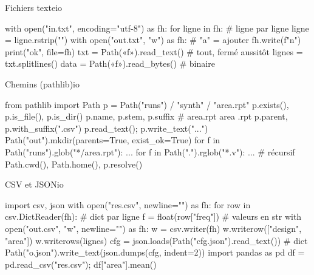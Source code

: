 \documentclass{article}
\begin{document}
\newpage
{}
\noindent
\begin{colonne}
\begin{bloc}{Fichiers texte}{io}
\begin{code}
with open("in.txt", encoding="utf-8") as fh:
    for ligne in fh:           # ligne par ligne
        ligne = ligne.rstrip("\n")
with open("out.txt", "w") as fh:  # "a" = ajouter
    fh.write(f"{n}\n")
    print("ok", file=fh)
txt = Path(«f»).read_text()      # tout, fermé aussitôt
lignes = txt.splitlines()
data = Path(«f»).read_bytes()    # binaire
\end{code}
\end{bloc}

\begin{bloc}{Chemins (pathlib)}{io}
\begin{code}
from pathlib import Path
p = Path("runs") / "synth" / "area.rpt"
p.exists(), p.is_file(), p.is_dir()
p.name, p.stem, p.suffix  # area.rpt area .rpt
p.parent, p.with_suffix(".csv")
p.read_text(); p.write_text("...")
Path("out").mkdir(parents=True, exist_ok=True)
for f in Path("runs").glob("*/area.rpt"): ...
for f in Path(".").rglob("*.v"): ...  # récursif
Path.cwd(), Path.home(), p.resolve()
\end{code}
\end{bloc}

\begin{bloc}{CSV et JSON}{io}
\begin{code}
import csv, json
with open("res.csv", newline="") as fh:
    for row in csv.DictReader(fh):  # dict par ligne
        f = float(row["freq"])      # valeurs en str
with open("out.csv", "w", newline="") as fh:
    w = csv.writer(fh)
    w.writerow(["design", "area"])
    w.writerows(lignes)
cfg = json.loads(Path("cfg.json").read_text())  # dict
Path("o.json").write_text(json.dumps(cfg, indent=2))
import pandas as pd
df = pd.read_csv("res.csv"); df["area"].mean()
\end{code}
\end{bloc}


\end{colonne}
\end{document}
